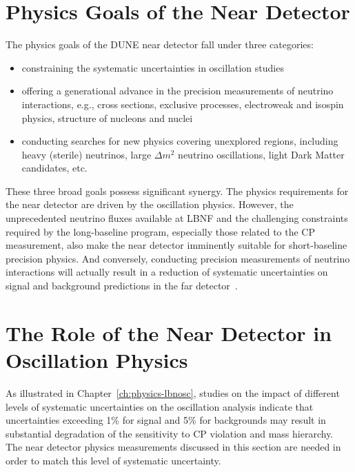 
\section{Physics Goals of the Near Detector}
\label{sec:physics-nd-goals}

The physics goals of the DUNE near detector fall under three categories: 

\begin{itemize}
\item constraining the systematic uncertainties in  oscillation studies
\item  offering a generational advance in the precision measurements of neutrino interactions, e.g., %
cross sections, exclusive processes, electroweak and isospin physics, structure of nucleons and nuclei %
\item conducting searches for new physics covering unexplored regions, 
including heavy (sterile) neutrinos, large $\Delta m^2$ neutrino oscillations, light Dark Matter 
candidates, etc. 
\end{itemize}

These three broad goals possess significant synergy. The physics requirements for the near detector are driven 
by the oscillation physics. However,  the unprecedented neutrino fluxes available at LBNF and the challenging 
constraints required by the long-baseline program, especially those related to the CP measurement, also  make the near detector imminently suitable for  short-baseline 
precision physics. And conversely, conducting precision measurements of neutrino 
interactions will actually %
result in a reduction of systematic uncertainties on signal and background 
predictions in the far detector~\cite{HIRESMNU, DPR, Adams:2013qkq}.  


\section{The Role of the Near Detector in Oscillation Physics} 
\label{sec-nd-oscl} 

As illustrated in Chapter~\ref{ch:physics-lbnosc}, studies on the impact of different levels of systematic 
uncertainties on the oscillation analysis indicate 
that uncertainties exceeding 1\% for signal and 5\% for backgrounds may result in 
substantial degradation of the sensitivity to CP violation and mass hierarchy. 
The near detector physics measurements discussed in this section are needed in order to match this level of systematic uncertainty.   

